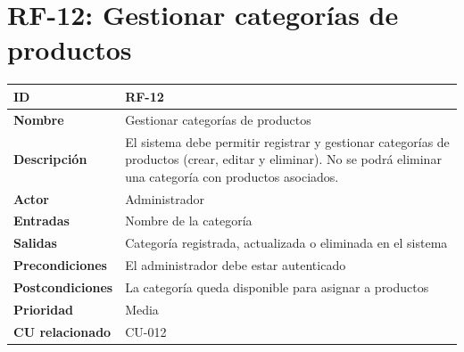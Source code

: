 \documentclass{article}
\begin{document}
\section*{RF-12: Gestionar categorías de productos}
\begin{center}
\renewcommand{\arraystretch}{1.4}
\begin{tabular}{|L{4cm}|L{12cm}|}
\hline
\textbf{ID} & RF-12 \\
\hline
\textbf{Nombre} & Gestionar categorías de productos \\
\hline
\textbf{Descripción} & El sistema debe permitir registrar y gestionar categorías de productos (crear, editar y eliminar). No se podrá eliminar una categoría con productos asociados. \\
\hline
\textbf{Actor} & Administrador \\
\hline
\textbf{Entradas} & Nombre de la categoría \\
\hline
\textbf{Salidas} & Categoría registrada, actualizada o eliminada en el sistema \\
\hline
\textbf{Precondiciones} & El administrador debe estar autenticado \\
\hline
\textbf{Postcondiciones} & La categoría queda disponible para asignar a productos \\
\hline
\textbf{Prioridad} & Media \\
\hline
\textbf{CU relacionado} & CU-012 \\
\hline
\end{tabular}
\end{center}
\end{document}

